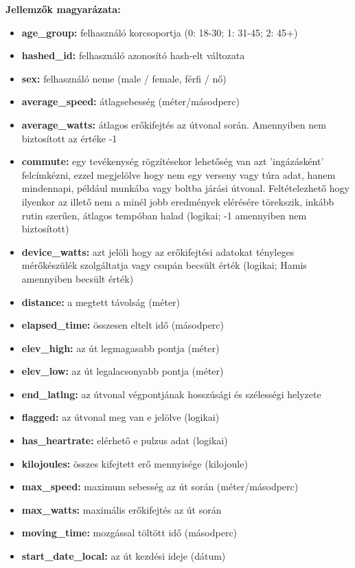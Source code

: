 \noindent \textbf{Jellemzők magyarázata:}
\begin{itemize}
	\item \textbf{age\_group: } felhasználó korcsoportja (0: 18-30; 1: 31-45; 2: 45+)
	\item \textbf{hashed\_id:} felhasználó azonosító hash-elt változata
	\item \textbf{sex: } felhasználó neme (male / female, férfi / nő)
	\item \textbf{average\_speed:} átlagsebesség (méter/másodperc)
	\item \textbf{average\_watts:} átlagos erőkifejtés az útvonal során. Amennyiben nem biztosított az értéke -1
	\item \textbf{commute:} egy tevékenység rögzítésekor lehetőség van azt 'ingázásként' felcímkézni, ezzel megjelölve hogy nem egy verseny vagy túra adat, hanem mindennapi, például munkába vagy boltba járási útvonal. Feltételezhető hogy ilyenkor az illető nem a minél jobb eredmények elérésére törekszik, inkább rutin szerűen, átlagos tempóban halad (logikai; -1 amennyiben nem biztosított)
	\item \textbf{device\_watts:} azt jelöli hogy az erőkifejtési adatokat tényleges mérőkészülék szolgáltatja vagy csupán becsült érték (logikai; Hamis amennyiben becsült érték) 
	\item \textbf{distance:} a megtett távolság (méter)
	\item \textbf{elapsed\_time:} összesen eltelt idő (másodperc)
	\item \textbf{elev\_high:} az út legmagasabb pontja (méter)
	\item \textbf{elev\_low:} az út legalacsonyabb pontja (méter)
	\item \textbf{end\_latlng:} az útvonal végpontjának hosszúsági és szélességi helyzete
	\item \textbf{flagged:} az útvonal meg van e jelölve (logikai)
	\item \textbf{has\_heartrate:} elérhető e pulzus adat (logikai)
	\item \textbf{kilojoules:} összes kifejtett erő mennyisége (kilojoule)
	\item \textbf{max\_speed:} maximum sebesség az út során (méter/másodperc)
	\item \textbf{max\_watts:} maximális erőkifejtés az út során
	\item \textbf{moving\_time:} mozgással töltött idő (másodperc)
	\item \textbf{start\_date\_local:} az út kezdési ideje (dátum)

\end{itemize}
